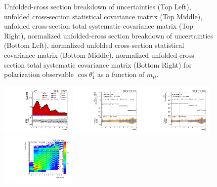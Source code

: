 \begin{figure}[htb]
\begin{center}
\caption{Unfolded-cross section breakdown of uncertainties (Top Left), unfolded cross-section statistical covariance matrix (Top Middle), unfolded cross-section total systematic covariance matrix (Top Right), normalized unfolded-cross section breakdown of uncertainties (Bottom Left), normalized unfolded cross-section statistical covariance matrix (Bottom Middle), normalized unfolded cross-section total systematic covariance matrix (Bottom Right) for polarization observable $\cos\theta_{1}^{r}$ as a function of $m_{t\bar{t}}$.}
\label{fig:b1r_mttbar_uncertainties}
\end{center}
\end{figure}
\clearpage
\begin{figure}[htb]
\begin{center}
 \includegraphics[width=0.32\textwidth]{fig_fullRun2UL/controlplots/combined/Hyp_LeptonBr_vs_TTBarMass.pdf}
 \includegraphics[width=0.32\textwidth]{fig_fullRun2UL/unfolding/combined/UnfoldedResults_b2r_mttbar.pdf}
 \includegraphics[width=0.32\textwidth]{fig_fullRun2UL/unfolding/combined/UnfoldedResultsNorm_b2r_mttbar.pdf} \\
 \includegraphics[width=0.32\textwidth]{fig_fullRun2UL/unfolding/combined/ResponseMatrix_b2r_mttbar.pdf}

\end{center}
\end{figure}
